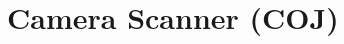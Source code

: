 \documentclass[
    headings=optiontotocandhead,%
    twoside,
    numbers=noenddot,%
    toc=flat, %
    12pt, %
    titlepage, %
    parskip=full, %
    listof=totoc, %
    listof=flat, %
    numbers=noenddot, %
    bibliography=totoc, %
    a4paper,DIV=14,
    BCOR=15mm,
]{scrbook}
\begin{document}






%





%

%

%


\chapter{Camera Scanner (COJ)}
\renewcommand{\kapitelautor}{Autor: Filip Coja}

\end{document}
